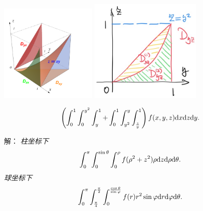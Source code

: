 \begin{frame}
	\linespread{1.5}
	
	\begin{center}
		\includegraphics[width=0.35\textwidth]{./images/ch11/xyz2zxy.pdf}
		\includegraphics[width=0.4\textwidth]{./images/ch10/dyz-12.jpg}
	\end{center}
	\small
	$$\left(\displaystyle\int_0^1\displaystyle\int_0^{y^2}\displaystyle\int_y^1+
	\displaystyle\int_0^1\displaystyle\int_{y^2}^y\displaystyle\int_{\frac zy}^1\right)f(x,y,z)\mathrm{d} x\mathrm{d} z\mathrm{d} y.$$
\end{frame}

\begin{frame}
	\linespread{1.5}

	\small 解：\it
	柱坐标下
	$$\displaystyle\int_0^{\pi}\displaystyle\int_0^{\sin\theta}\displaystyle\int_0^{\rho}
	f(\rho^2+z^2)\rho\mathrm{d} z\mathrm{d}\rho\mathrm{d}\theta.$$
	球坐标下
	$$\displaystyle\int_0^{\pi}\displaystyle\int_{\frac{\pi}{4}}^{\frac{\pi}{2}}
	\displaystyle\int_0^{\frac{\cos\theta}{\sin\varphi}}
	f(r)r^2\sin\varphi\mathrm{d} r\mathrm{d}\varphi\mathrm{d}\theta.$$
\end{frame}

